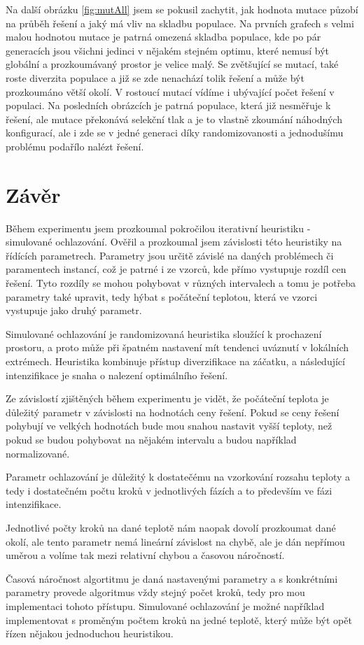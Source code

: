 \documentclass[11pt]{article}
\begin{document}
Na další obrázku \ref{fig:mutAll} jsem se pokusil zachytit, jak hodnota mutace půzobí na průběh řešení a jaký má vliv na skladbu populace. Na prvních grafech s velmi malou hodnotou mutace je patrná omezená skladba populace, kde po pár generacích jsou všichni jedinci v nějakém stejném optimu, které nemusí být globální a prozkoumávaný prostor je velice malý. Se zvětšující se mutací, také roste diverzita populace a již se zde nenachází tolik řešení a může být prozkoumáno větší okolí. V rostoucí mutací vídíme i ubývající počet řešení v populaci. Na posledních obrázcích je patrná populace, která již nesměřuje k řešení, ale mutace překonává selekční tlak a je to vlastně zkoumání náhodných konfigurací, ale i zde se v jedné generaci díky randomizovanosti a jednodušímu problému podařílo nalézt řešení. 



\section{Závěr}\label{kap:zaver}
Během experimentu jsem prozkoumal pokročilou iterativní heuristiku - simulované ochlazování. Ověřil a prozkoumal jsem závislosti této heuristiky na řídících parametrech. Parametry jsou určitě závislé na daných problémech či paramentech instancí, což je patrné i ze vzorců, kde přímo vystupuje rozdíl cen řešení. Tyto rozdíly se mohou pohybovat v různých intervalech a tomu je potřeba parametry také upravit, tedy hýbat s počáteční teplotou, která ve vzorci vystupuje jako druhý parametr. 

Simulované ochlazování je randomizovaná heuristika sloužící k prochazení prostoru, a proto může při špatném nastavení mít tendenci uváznutí v lokálních extrémech. Heuristika kombinuje přístup diverzifikace na záčatku, a následující intenzifikace je snaha o nalezení optimálního řešení. 

Ze závislostí zjištěných během experimentu je vidět, že počáteční teplota je důležitý parametr v závislosti na hodnotách ceny řešení. Pokud se ceny řešení pohybují ve velkých hodnotách bude mou snahou nastavit vyšší teploty, než pokud se budou pohybovat na nějakém intervalu a budou například normalizované. 

Parametr ochlazování je důležitý k dostatečému na vzorkování rozsahu teploty a tedy i dostatečném počtu kroků v jednotlivých fázích a to především ve fázi intenzifikace. 

Jednotlivé počty kroků na dané teplotě nám naopak dovolí prozkoumat dané okolí, ale tento parametr nemá lineární závislost na chybě, ale je dán nepřímou uměrou a volíme tak mezi relativní chybou a časovou náročností. 

Časová náročnost algortitmu je daná nastavenými parametry a s konkrétními parametry provede algoritmus vždy stejný počet kroků, tedy pro mou implementaci tohoto přístupu. Simulované ochlazování je možné například implementovat s proměným počtem kroků na jedné teplotě, který může být opět řízen nějakou jednoduchou heuristikou.
\end{document}
